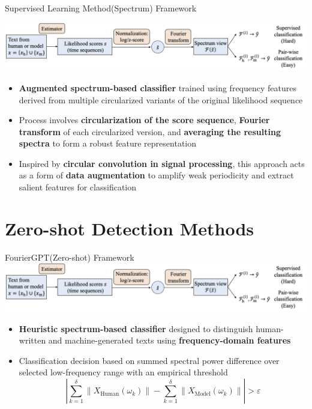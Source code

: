 \documentclass[serif]{beamer}
\begin{document}
 \begin{frame}{Supervised Learning Method(Spectrum) Framework}
    
     \centering
\includegraphics[width=1.0\textwidth]{images/procedure.png}
\vspace{0.3cm}
\small{
\begin{itemize}
    \item \textbf{Augmented spectrum-based classifier} trained using frequency features derived from multiple circularized variants of the original likelihood sequence
    \item Process involves \textbf{circularization of the score sequence}, \textbf{Fourier transform} of each circularized version, and \textbf{averaging the resulting spectra} to form a robust feature representation
    \item Inspired by \textbf{circular convolution in signal processing}, this approach acts as a form of \textbf{data augmentation} to amplify weak periodicity and extract salient features for classification
\end{itemize}
}
 \end{frame}


\section{Zero-shot Detection Methods}

\begin{frame}{FourierGPT(Zero-shot) Framework}
\centering
\includegraphics[width=1.0\textwidth]{images/procedure.png}
\vspace{0.3cm}
\small{
\begin{itemize}
    \item \textbf{Heuristic spectrum-based classifier} designed to distinguish human-written and machine-generated texts using \textbf{frequency-domain features}
    \item Classification decision based on summed spectral power difference over selected low-frequency range with an empirical threshold
    \[\left| \sum_{k=1}^{\delta} \| X_{\text{Human}}(\omega_k) \| - \sum_{k=1}^{\delta} \| X_{\text{Model}}(\omega_k) \| \right| > \varepsilon\]


\end{itemize}
}
\end{frame}
\end{document}
